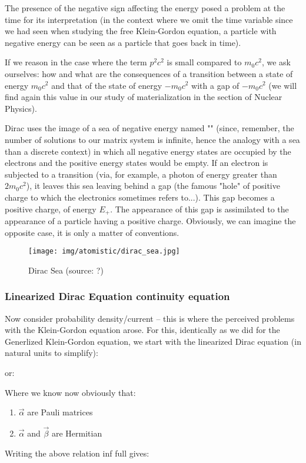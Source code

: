 	The presence of the negative sign affecting the energy posed a problem at the time for its interpretation (in the context where we omit the time variable since we had seen when studying the free Klein-Gordon equation, a particle with negative energy can be seen as a particle that goes back in time).

	If we reason in the case where the term $p^2c^2$ is small compared to $m_0c^2$, we ask ourselves: how and what are the consequences of a transition between a state of energy $m_0c^2$ and that of the state of energy $-m_0c^2$ with a gap of $-m_0c^2$ (we will find again this value in our study of materialization in the section of Nuclear Physics).

	Dirac uses the image of a sea of negative energy named "" (since, remember, the number of solutions to our matrix system is infinite, hence the analogy with a sea than a discrete context) in which all negative energy states are occupied by the electrons and the positive energy states would be empty. If an electron is subjected to a transition (via, for example, a photon of energy greater than $2m_0c^2$), it leaves this sea leaving behind a gap (the famous "hole" of positive charge to which the electronics sometimes refers to...). This gap becomes a positive charge, of energy $E_{+}$. The appearance of this gap is assimilated to the appearance of a particle having a positive charge. Obviously, we can imagine the opposite case, it is only a matter of conventions.
	\begin{figure}[H]
		\centering
		\texttt{[image: img/atomistic/dirac\_sea.jpg]}	
		\caption[Dirac Sea]{Dirac Sea (source: ?)}
	\end{figure}
	\subsubsection{Linearized Dirac Equation continuity equation}
	Now consider probability density/current – this is where the perceived problems with the Klein-Gordon equation arose. For this, identically as we did for the Generlized Klein-Gordon equation, we start with the linearized Dirac equation (in natural units to simplify):
	
	or:
	
	Where we know now obviously that:
	\begin{enumerate}
		\item $\vec{\alpha}$ are Pauli matrices
		
		\item $\vec{\alpha}$ and $\vec{\beta}$ are Hermitian
	\end{enumerate}
	Writing the above relation inf full gives:
	
